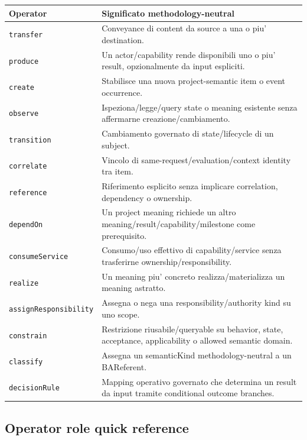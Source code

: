 \documentclass[11pt,a4paper]{article}
\newcommand{\code}[1]{\nolinkurl{#1}}
\begin{document}
\footnotesize
\begin{longtable}{L{0.25\textwidth}L{0.61\textwidth}}
\toprule
\textbf{Operator} & \textbf{Significato methodology-neutral} \\
\midrule\endhead
\code{transfer} & Conveyance di content da source a una o piu' destination. \\
\code{produce} & Un actor/capability rende disponibili uno o piu' result, opzionalmente da input espliciti. \\
\code{create} & Stabilisce una nuova project-semantic item o event occurrence. \\
\code{observe} & Ispeziona/legge/query state o meaning esistente senza affermarne creazione/cambiamento. \\
\code{transition} & Cambiamento governato di state/lifecycle di un subject. \\
\code{correlate} & Vincolo di same-request/evaluation/context identity tra item. \\
\code{reference} & Riferimento esplicito senza implicare correlation, dependency o ownership. \\
\code{dependOn} & Un project meaning richiede un altro meaning/result/capability/milestone come prerequisito. \\
\code{consumeService} & Consumo/uso effettivo di capability/service senza trasferirne ownership/responsibility. \\
\code{realize} & Un meaning piu' concreto realizza/materializza un meaning astratto. \\
\code{assignResponsibility} & Assegna o nega una responsibility/authority kind su uno scope. \\
\code{constrain} & Restrizione riusabile/queryable su behavior, state, acceptance, applicability o allowed semantic domain. \\
\code{classify} & Assegna un semanticKind methodology-neutral a un BAReferent. \\
\code{decisionRule} & Mapping operativo governato che determina un result da input tramite conditional outcome branches. \\
\bottomrule
\end{longtable}
\normalsize

\subsection{Operator role quick reference}
\end{document}
